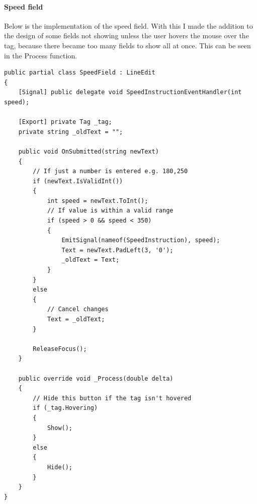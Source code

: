 \documentclass{article}
\begin{document}
\paragraph{Speed field}
Below is the implementation of the speed field.
With this I made the addition to the design of some fields not showing unless the user hovers the mouse over the tag, because there became too many fields to show all at once.
This can be seen in the Process function.
\lstset{style=csharp}
\begin{lstlisting}[caption=Speed field script]
public partial class SpeedField : LineEdit
{
    [Signal] public delegate void SpeedInstructionEventHandler(int speed);

    [Export] private Tag _tag;
    private string _oldText = "";

    public void OnSubmitted(string newText)
    {
        // If just a number is entered e.g. 180,250
        if (newText.IsValidInt())
        {
            int speed = newText.ToInt();
            // If value is within a valid range
            if (speed > 0 && speed < 350)
            {
                EmitSignal(nameof(SpeedInstruction), speed);
                Text = newText.PadLeft(3, '0');
                _oldText = Text;
            }
        }
        else
        {
            // Cancel changes
            Text = _oldText;
        }

        ReleaseFocus();
    }

    public override void _Process(double delta)
    {
        // Hide this button if the tag isn't hovered
        if (_tag.Hovering)
        {
            Show();
        }
        else
        {
            Hide();
        }
    }
}
\end{lstlisting}
\end{document}
